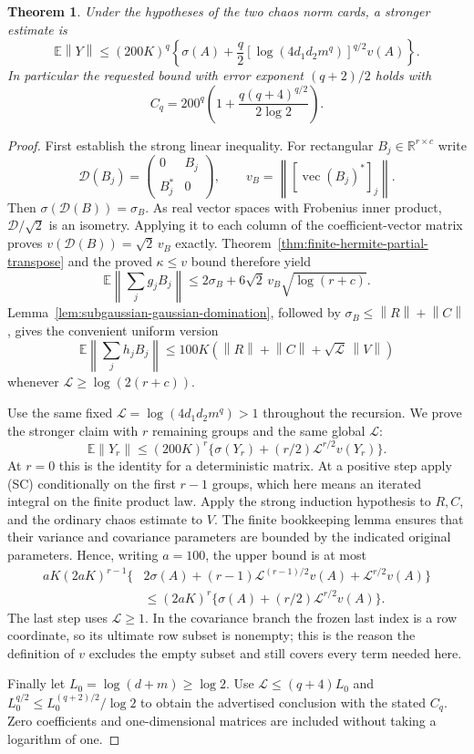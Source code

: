 \documentclass[11pt,a4paper]{article}
\newcommand{\R}{\mathbb R}
\newcommand{\norm}[1]{\left\lVert#1\right\rVert}
\newtheorem{theorem}{Theorem}[section]
\begin{document}
\begin{theorem}
Under the hypotheses of the two chaos norm cards, a stronger estimate is
\[
 \mathbb E\norm Y\leq(200K)^q
       \left\{\sigma(A)+\frac q2
          [\log(4d_1d_2m^q)]^{q/2}v(A)\right\}.
\]
In particular the requested bound with error exponent $(q+2)/2$ holds
with
\[
 C_q=200^q\left(1+
            \frac{q(q+4)^{q/2}}{2\log2}\right).
\]
\end{theorem}
\begin{proof}
First establish the strong linear inequality.  For rectangular
$B_j\in\R^{r\times c}$ write
\[
 \mathcal D(B_j)=\begin{pmatrix}0&B_j\\B_j^*&0\end{pmatrix},
 \qquad v_B=\norm{[\operatorname{vec}(B_j)^*]_j}.
\]
Then $\sigma(\mathcal D(B))=\sigma_B$.
As real vector spaces with Frobenius inner product,
$\mathcal D/\sqrt2$ is an isometry.  Applying it to each column of
the coefficient-vector matrix proves
$v(\mathcal D(B))=\sqrt2\,v_B$ exactly.
Theorem~\ref{thm:finite-hermite-partial-transpose} and the proved
$\kappa\leq v$ bound therefore yield
\[
 \mathbb E\norm{\sum_jg_jB_j}
 \leq2\sigma_B+6\sqrt2\,v_B\sqrt{\log(r+c)}.
\]
Lemma~\ref{lem:subgaussian-gaussian-domination}, followed by
$\sigma_B\leq\norm R+\norm C$, gives the convenient uniform version
\[
 \mathbb E\norm{\sum_jh_jB_j}
 \leq100K\left(\norm R+\norm C+\sqrt{\mathcal L}\,\norm V\right)
 \tag{SC}
\]
whenever $\mathcal L\geq\log(2(r+c))$.

Use the same fixed $\mathcal L=\log(4d_1d_2m^q)>1$ throughout the
recursion.  We prove the stronger claim with $r$ remaining groups and
the same global $\mathcal L$:
\[
 \mathbb E\norm{Y_r}
 \leq(200K)^r
       \{\sigma(Y_r)+(r/2)\mathcal L^{r/2}v(Y_r)\}.
\]
At $r=0$ this is the identity for a deterministic matrix.  At a positive
step apply (SC) conditionally on the first $r-1$ groups, which here means
an iterated integral on the finite product law.  Apply the strong
induction hypothesis to $R,C$, and the ordinary chaos estimate to $V$.
The finite bookkeeping lemma ensures that their variance and covariance
parameters are bounded by the indicated original parameters.  Hence,
writing $a=100$, the upper bound is at most
\begin{align*}
 aK(2aK)^{r-1}\{&2\sigma(A)
    +(r-1)\mathcal L^{(r-1)/2}v(A)
    +\mathcal L^{r/2}v(A)\}\\
 &\leq(2aK)^r\{\sigma(A)+(r/2)\mathcal L^{r/2}v(A)\}.
\end{align*}
The last step uses $\mathcal L\geq1$.  In the covariance branch the
frozen last index is a row coordinate, so its ultimate row subset is
nonempty; this is the reason the definition of $v$ excludes the empty
subset and still covers every term needed here.

Finally let $L_0=\log(d+m)\geq\log2$.  Use
$\mathcal L\leq(q+4)L_0$ and
$L_0^{q/2}\leq L_0^{(q+2)/2}/\log2$ to obtain the advertised conclusion
with the stated $C_q$.  Zero coefficients and one-dimensional matrices
are included without taking a logarithm of one.
\end{proof}
\end{document}
